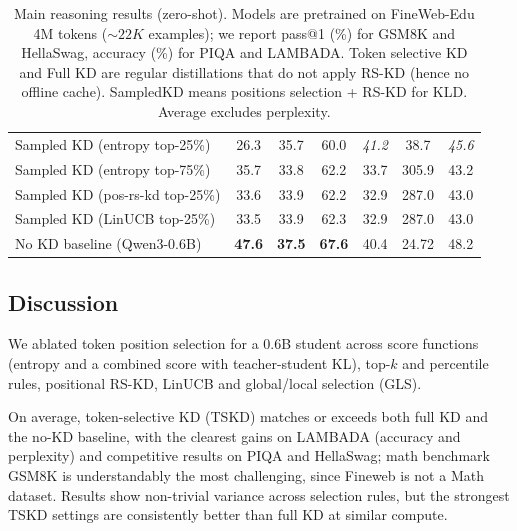 \documentclass[11pt]{article}
\begin{document}
\begin{table}[t]
{\begin{tabular}{lcccccc}
		\midrule
		Sampled KD (entropy top-25\%)              & 26.3                  & 35.7                      & 60.0                 & \textit{41.2}               & 38.7                    & \textit{45.6} \\
		Sampled KD (entropy top-75\%)              & 35.7                  & 33.8                      & 62.2                 & 33.7                        & 305.9                   & 43.2          \\
		Sampled KD (pos-rs-kd top-25\%)            & 33.6                  & 33.9                      & 62.2                 & 32.9                        & 287.0                   & 43.0          \\
		Sampled KD (LinUCB top-25\%)               & 33.5                  & 33.9                      & 62.3                 & 32.9                        & 287.0                   & 43.0          \\
		\midrule
		No KD baseline (Qwen3-0.6B)      & \textbf{47.6}         & \textbf{37.5}             & \textbf{67.6}        & 40.4                        & 24.72                   & 48.2          \\
		\bottomrule
	\end{tabular}
	} %
	\caption{Main reasoning results (zero-shot). Models are pretrained on FineWeb-Edu 4M tokens ($\sim 22K$ examples); we report pass@1 (\%) for GSM8K and HellaSwag, accuracy (\%) for PIQA and LAMBADA.
		Token selective KD and Full KD are regular distillations that do not apply RS-KD (hence no offline cache).
		SampledKD means positions selection + RS-KD for KLD.
		Average excludes perplexity.}
	\label{tab:main-reasoning}
\end{table}


\subsection{Discussion}
\label{sec:discussion}
We ablated token position selection for a 0.6B student across score functions (entropy and a combined score with teacher-student KL), top-$k$ and percentile rules, positional RS-KD, LinUCB and global/local selection (GLS).

On average, token-selective KD (TSKD) matches or exceeds both full KD and the no-KD baseline, with the clearest gains on LAMBADA (accuracy and perplexity) and competitive results on PIQA and HellaSwag; math benchmark GSM8K is understandably the most challenging, since Fineweb is not a Math dataset.
Results show non-trivial variance across selection rules, but the strongest TSKD settings are consistently better than full KD at similar compute.
\end{document}
